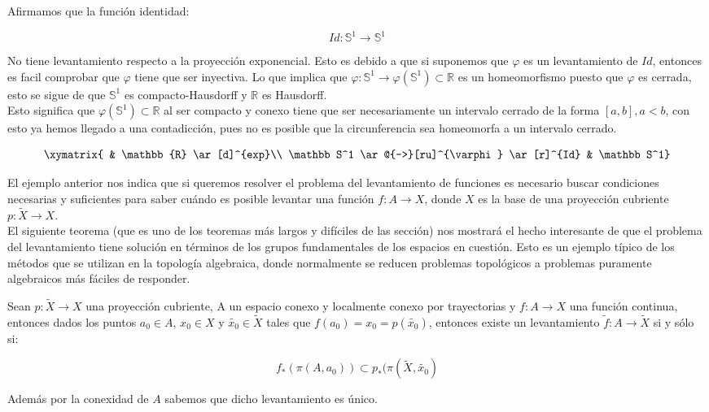 \begin{example} 

Afirmamos que la funci\'on identidad: 

$$Id:\mathbb S^1 \rightarrow \mathbb S^1$$

No tiene levantamiento respecto a la proyecci\'on exponencial. Esto es debido a que si suponemos que $\varphi$ es un levantamiento de $Id$, entonces es facil comprobar que $\varphi$ tiene que ser inyectiva. Lo que implica que $\varphi: \mathbb S^1 \rightarrow \varphi(\mathbb S^1) \subset \mathbb{R}$ es un homeomorfismo puesto que $\varphi$ es cerrada, esto se sigue de que $\mathbb S^1$ es compacto-Hausdorff y $\mathbb{R}$ es Hausdorff.\\
Esto significa que $\varphi(\mathbb S^1) \subset \mathbb{R}$ al ser compacto y conexo tiene que ser necesariamente un intervalo cerrado de la forma $[a,b],a<b$, con esto ya hemos llegado a una contadicci\'on, pues no es posible que la circunferencia sea homeomorfa a un intervalo cerrado. 


$$ \xymatrix{    & \mathbb{R} \ar[d]^{exp}\\
              \mathbb S^1 \ar@{-->}[ru]^{\varphi} \ar[r]^{Id} & \mathbb S^1} $$




\end{example}

El ejemplo anterior nos indica que si queremos resolver el problema del levantamiento de funciones es necesario buscar condiciones necesarias y suficientes para saber cu\'ando es posible levantar una funci\'on $f:A \rightarrow X$, donde $X$ es la base de una proyecci\'on cubriente $p:\widetilde{X} \rightarrow X$.\\
El siguiente teorema (que es uno de los teoremas m\'as largos y dif\'iciles de las secci\'on) nos mostrar\'a el hecho interesante de que el problema del levantamiento tiene soluci\'on en t\'erminos de los grupos fundamentales de los espacios en cuesti\'on. Esto es un ejemplo t\'ipico de los m\'etodos que se utilizan en la topolog\'ia algebraica, donde normalmente se reducen problemas topol\'ogicos a problemas puramente algebraicos m\'as f\'aciles de responder.\\ 

\begin{theorem}\label{LevantFunc}

Sean $p:\widetilde{X} \rightarrow X$ una proyecci\'on cubriente, A un espacio conexo y localmente conexo por trayectorias y $f:A \rightarrow X$ una funci\'on continua, entonces dados los puntos $a_0 \in A$, $x_0 \in X$ y $\widetilde{x_0} \in \widetilde{X}$ tales que $f(a_0)=x_0=p(\widetilde{x_0})$, entonces existe un levantamiento $\widetilde{f}:A \rightarrow \widetilde{X}$ si y s\'olo si:

$$f_*(\pi(A,a_0))\subset p_*(\pi(\widetilde{X},\widetilde{x_0})$$

Adem\'as por la conexidad de $A$ sabemos que dicho levantamiento es \'unico.\\ 



\end{theorem}

